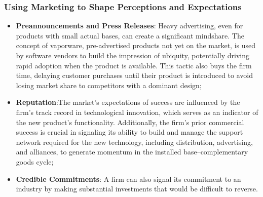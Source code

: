 \documentclass[12pt]{article}
\begin{document}
\subsubsection{Using Marketing to Shape Perceptions and Expectations}
\begin{itemize}
    \item \textbf{Preannouncements and Press Releases}:  Heavy advertising, even for products with small actual bases, can create a significant mindshare. The concept of vaporware, pre-advertised products not yet on the market, is used by software vendors to build the impression of ubiquity, potentially driving rapid adoption when the product is available. This tactic also buys the firm time, delaying customer purchases until their product is introduced to avoid losing market share to competitors with a dominant design;
    \item \textbf{Reputation}:The market's expectations of success are influenced by the firm's track record in technological innovation, which serves as an indicator of the new product's functionality. Additionally, the firm's prior commercial success is crucial in signaling its ability to build and manage the support network required for the new technology, including distribution, advertising, and alliances, to generate momentum in the installed base–complementary goods cycle;
    \item \textbf{Credible Commitments}: A firm can also signal its commitment to an industry by making substantial investments
    that would be difficult to reverse.
\end{itemize}
\end{document}
